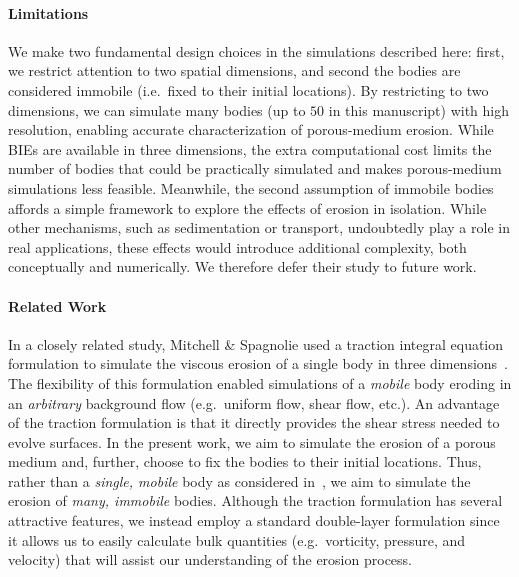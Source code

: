 \documentclass[preprint, 10pt]{elsarticle}
\begin{document}
\paragraph{Limitations}
We make two fundamental design choices in the simulations described here: first, we restrict attention to two spatial dimensions, and second the bodies are considered immobile (i.e.~fixed to their initial locations). By restricting to two dimensions, we can simulate many bodies (up to $50$ in this manuscript) with high resolution, enabling accurate characterization of porous-medium erosion. While BIEs are available in three dimensions, the extra computational cost limits the number of bodies that could be practically simulated and makes porous-medium simulations less feasible. Meanwhile, the second assumption of immobile bodies affords a simple framework to explore the effects of erosion in isolation. While other mechanisms, such as sedimentation or transport, undoubtedly play a role in real applications, these effects would introduce additional complexity, both conceptually and numerically. We therefore defer their study to future work.

\paragraph{Related Work}
In a closely related study, Mitchell \& Spagnolie used a traction integral equation formulation to simulate the viscous erosion of a single body in three dimensions~\cite{mit-spa2016}. The flexibility of this formulation enabled simulations of a {\em mobile} body eroding in an {\em arbitrary} background flow (e.g.~uniform flow, shear flow, etc.).  An advantage of the traction formulation is that it directly provides the shear stress needed to evolve surfaces.  In the present work, we aim to simulate the erosion of a porous medium and, further, choose to fix the bodies to their initial locations. Thus, rather than a {\em single, mobile} body as considered in~\cite{mit-spa2016}, we aim to simulate the erosion of {\em many, immobile} bodies. Although the traction formulation has several attractive features, we instead employ a standard double-layer formulation since it allows us to easily calculate bulk quantities (e.g.~vorticity, pressure, and velocity) that will assist our understanding of the erosion process.
\end{document}
